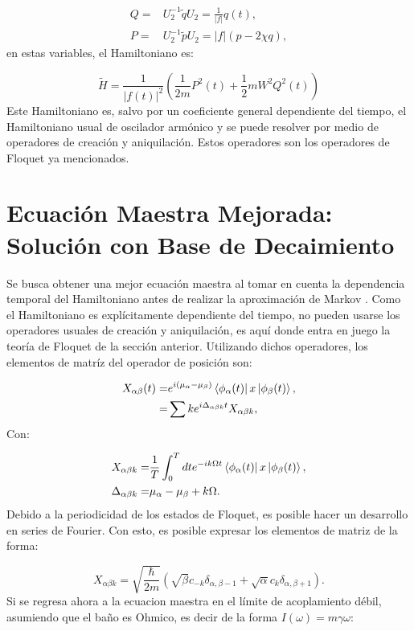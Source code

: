 \documentclass[a4paper,10pt]{report}
\begin{document}
\begin{align}
Q=&U_2^{-1}\tilde{q}U_2 =\frac{1}{|f|}q(t),\\
P=&U_2^{-1}\tilde{p}U_2 = |f|(p-2\chi q), 
\end{align} en estas variables, el Hamiltoniano es:

\begin{equation}\label{QTDHO}
\tilde{H} = \frac{1}{|f(t)|^2}(\frac{1}{2m}P^2(t)+\frac{1}{2}mW^2Q^2(t))
\end{equation}Este Hamiltoniano es, salvo por un coeficiente general dependiente del tiempo, el Hamiltoniano usual de oscilador armónico y se puede resolver por medio de operadores de creación y aniquilación. Estos operadores son los operadores de Floquet ya mencionados.

\section{Ecuación Maestra Mejorada: Solución con Base de Decaimiento}

Se busca obtener una mejor ecuación maestra al tomar en cuenta la dependencia temporal del Hamiltoniano antes de realizar la aproximación de Markov \cite{HanngiDQS}. Como el Hamiltoniano es explícitamente dependiente del tiempo, no pueden usarse los operadores usuales de creación y aniquilación, es aquí donde entra en juego la teoría de Floquet de la sección anterior. Utilizando dichos operadores, los elementos de matríz del operador de posición son:

\begin{align}
X_{\alpha \beta}(t) =& e^{i(\mu_{\alpha}-\mu_{\beta})}\Bra{\phi_{\alpha}(t)}x\Ket{\phi_{\beta}(t)},\\
=& \sum{k} e^{i\Delta_{\alpha\beta k}t} X_{\alpha\beta k},
\end{align}Con:

\begin{align*}
X_{\alpha\beta k} =& \frac{1}{T} \int_0^T dt e^{-ik\Omega t}\Bra{\phi_{\alpha}(t)}x\Ket{\phi_{\beta}(t)}, \\
\Delta_{\alpha \beta k} =& \mu_{\alpha}-\mu_{\beta} + k\Omega.
\end{align*}Debido a la periodicidad de los estados de Floquet, es posible hacer un desarrollo en series de Fourier. Con esto, es posible expresar los elementos de matriz de la forma:

\begin{equation}
X_{\alpha\beta k} = \sqrt{\frac{\hbar}{2m}}(\sqrt{\beta}c_{-k} \delta_{\alpha,\beta-1}+\sqrt{\alpha}c_k\delta_{\alpha,\beta+1}).
\end{equation} Si se regresa ahora a la ecuacion maestra en el límite de acoplamiento débil, asumiendo que el baño es Ohmico, es decir de la forma $I(\omega) = m\gamma \omega$:
\end{document}
